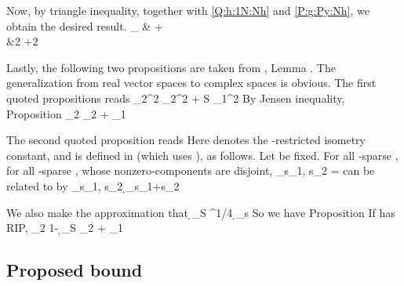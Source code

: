 Now, by triangle inequality, together with \eqref {Q:h:1N:Nh} and \eqref {P:g:Py:Nh}, we obtain the desired result.
%
 {
 _\infty
\leq &
+  \notag \\
%
\simeq &2  +2  
}

Lastly, the following two propositions are taken from \cite {CaT07}, Lemma .
The generalization from real vector spaces to complex spaces is obvious.
The first quoted propositions reads
%
 {
 _2^2
\leq {} _2^2 +  {S}  _1^2 
}
%
By Jensen inequality,
%
\Result
{Proposition}
{
%
 {
 _2
\leq {} _2 +  {}  _1 
}
}

The second quoted proposition reads
%
%
Here  denotes the -restricted isometry constant, and is defined in \cite {Can05} (which uses \m {\th}), as follows.
Let  be fixed.
For all -sparse , for all -sparse , whose nonzero-components are disjoint,
%
 {
\tilde {\d} _{s_1, s_2}
= \inf {} 
}
%
 can be related to  by \cite {Can05}
 {
\tilde {\d} _{s_1, s_2}
\leq \d_{s_1+s_2} 
}

We also make the approximation that
%
 {
\d_{S}
\leq {}  ^{1/4} \d_{s} 
}
%
So we have
%
\Result
{Proposition}
{
If  has  RIP,
%
 {
 _2
\leq {} {1-  \d_{S}}  _2
+  { }  _1 
}
}


\subsection {Proposed bound}

